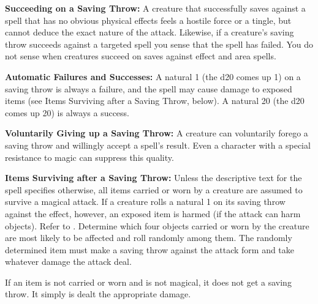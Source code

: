 \textbf{Succeeding on a Saving Throw:} A creature that successfully saves against a spell that has no obvious physical effects feels a hostile force or a tingle, but cannot deduce the exact nature of the attack. Likewise, if a creature's saving throw succeeds against a targeted spell you sense that the spell has failed. You do not sense when creatures succeed on saves against effect and area spells.

\textbf{Automatic Failures and Successes:} A natural 1 (the d20 comes up 1) on a saving throw is always a failure, and the spell may cause damage to exposed items (see Items Surviving after a Saving Throw, below). A natural 20 (the d20 comes up 20) is always a success.

\textbf{Voluntarily Giving up a Saving Throw:} A creature can voluntarily forego a saving throw and willingly accept a spell's result. Even a character with a special resistance to magic can suppress this quality.

\textbf{Items Surviving after a Saving Throw:} Unless the descriptive text for the spell specifies otherwise, all items carried or worn by a creature are assumed to survive a magical attack. If a creature rolls a natural 1 on its saving throw against the effect, however, an exposed item is harmed (if the attack can harm objects). Refer to . Determine which four objects carried or worn by the creature are most likely to be affected and roll randomly among them. The randomly determined item must make a saving throw against the attack form and take whatever damage the attack deal.

If an item is not carried or worn and is not magical, it does not get a saving throw. It simply is dealt the appropriate damage.


